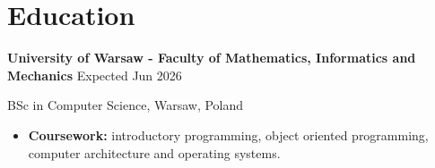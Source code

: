 \renewcommand{\subsection}[3]{
    \noindent\textbf{#1}  \emph{#2} \hfill #3 \break
}

\section{Education}
\subsection{University of Warsaw - Faculty of Mathematics, Informatics and Mechanics}{}{Expected Jun 2026}
BSc in Computer Science, Warsaw, Poland \hfill

\begin{itemize}
	\item \textbf{Coursework:} introductory programming, object oriented programming, computer architecture and operating systems.
\end{itemize}


\vspace{1em}
